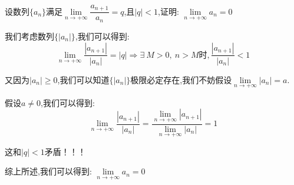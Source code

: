 \begin{proposition}
	设数列$\{a_{n}\}$满足$\lim\limits_{n\rightarrow+\infty}\dfrac{a_{n+1}}{a_{n}}=q$,且$|q|<1$,证明:  $\lim\limits_{n\rightarrow+\infty}a_{n}=0$
\end{proposition}
\begin{solution}
	
	我们考虑数列$\{|a_{n}|\}$,我们可以得到:  
	$$\lim\limits_{n\rightarrow +\infty}\dfrac{|a_{n+1}|}{|a_{n}|}=|q|\Rightarrow \exists\ M>0,\ n>M\text{时}, \dfrac{|a_{n+1}|}{|a_{n}|}<1$$
	
	又因为$|a_{n}|\geq 0$,我们可以知道$\{|a_{n}|\}$极限必定存在,我们不妨假设$\lim\limits_{n\rightarrow+\infty}|a_{n}|=a$.
	
	假设$a\neq 0$,我们可以得到:  $$\lim\limits_{n\rightarrow  +\infty}\dfrac{|a_{n+1}|}{|a_{n}|}=\dfrac{\lim\limits_{n\rightarrow  +\infty}|a_{n+1}|}{\lim\limits_{n\rightarrow  +\infty}|a_{n}|}=1$$
	
	这和$|q|<1$矛盾！！！
	
	
	综上所述,我们可以得到:  $\lim\limits_{n\rightarrow+\infty}a_{n}=0$
\end{solution}

